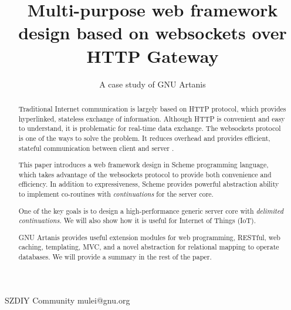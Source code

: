 \documentclass[numbers,numberedpars]{sigplanconf}
\begin{document}
\setlength{\pdfpageheight}{\paperheight}
\setlength{\pdfpagewidth}{\paperwidth}




\title{Multi-purpose web framework design based on websockets over HTTP Gateway}
\subtitle{A case study of GNU Artanis}

           {SZDIY Community}
           {mulei@gnu.org}

\maketitle

\begin{abstract}
  Traditional Internet communication is largely based on HTTP protocol, which provides hyperlinked, stateless exchange of information.
  Although HTTP is convenient and easy to understand, it is problematic for real-time data exchange. The websockets protocol is one of the ways to solve the problem. It reduces overhead and provides efficient, stateful communication between client and server \citep{6197172}.
  
  This paper introduces a web framework design in Scheme programming language, which takes advantage of the websockets protocol to provide both convenience and efficiency. In addition to expressiveness, Scheme provides powerful abstraction ability to implement co-routines with {\it continuations} for the server core.

  One of the key goals is to design a high-performance generic server core with {\it delimited continuations}. We will also show how it is useful for Internet of Things (IoT).
  
  GNU Artanis provides useful extension modules for web programming, RESTful, web caching, templating, MVC, and a novel abstraction for relational mapping to operate databases. We will provide a summary in the rest of the paper.
\end{abstract}
\end{document}
